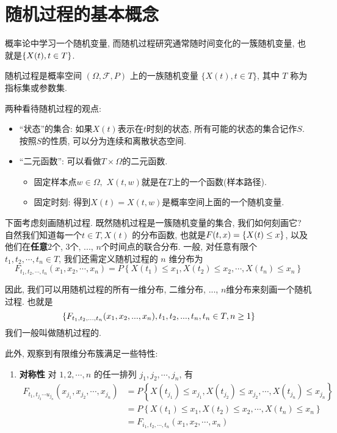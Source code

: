 \documentclass{ctexart}
\begin{document}
\section{随机过程的基本概念}

概率论中学习一个随机变量, 而随机过程研究通常随时间变化的一簇随机变量, 也就是$\{X(t), t\in T\}$. 

\begin{definition}[随机过程]
    随机过程是概率空间 $(\Omega, \mathscr F, P)$ 上的一族随机变量 $\{X(t), t \in T\}$, 其中 $T$ 称为指标集或参数集. 
\end{definition}

两种看待随机过程的观点: 
\begin{itemize}
    \item ``状态''的集合: 如果$X(t)$表示在$t$时刻的状态, 所有可能的状态的集合记作$S$. 按照$S$的性质, 可以分为连续和离散状态空间. 
    \item ``二元函数'': 可以看做$T\times \Omega$的二元函数. 
\begin{itemize}
    \item 固定样本点$w\in \Omega,$ $X(t,w)$就是在$T$上的一个函数(样本路径). 
    \item 固定时刻: 得到$X(t)=X(t,w)$是概率空间上面的一个随机变量. 
\end{itemize}
\end{itemize}

下面考虑刻画随机过程. 既然随机过程是一簇随机变量的集合, 我们如何刻画它? 自然我们知道每一个$t \in T, X(t)$
的分布函数, 也就是$F(t,x)=\{X(t)\leq x\}$, 以及他们在{\bf{任意}}$2$个, 3个, $...$, $n$个时间点的联合分布.  一般, 对任意有限个 $t_1, t_2, \cdots, t_n \in T$, 我们还需定义随机过程的 $n$ 维分布为
\[
    F_{t_1,t_2, \cdots, t_n}\left(x_1, x_2, \cdots, x_n\right)=P\left\{X\left(t_1\right) \leqslant x_1, X\left(t_2\right) \leqslant x_2, \cdots, X\left(t_n\right) \leqslant x_n\right\}
\]

因此, 我们可以用随机过程的所有一维分布, 二维分布, ..., $n$维分布来刻画一个随机过程. 也就是
\[
    \{F_{t_1,t_2, ... , t_n}(x_1,x_2, ..., x_n), t_1, t_2, ..., t_n,t_n \in T, n\geq 1\}
\]
我们一般叫做随机过程的. 

此外, 观察到有限维分布簇满足一些特性: 
\begin{enumerate}
    \item {\bf{对称性}} 对 $1,2, \cdots, n$ 的任一排列 $j_1, j_2, \cdots, j_n$, 有
        \[
            \begin{aligned}
F_{t_1, t_{j_2} \cdots u_{j_n}}\left(x_{j_1}, x_{j_2}, \cdots, x_{j_n}\right) & =P\left\{X\left(t_{j_1}\right) \leqslant x_{j_1}, X\left(t_{j_2}\right) \leqslant x_{j_2}, \cdots, X\left(t_{j_n}\right) \leqslant x_{j_n}\right\} \\
& =P\left\{X\left(t_1\right) \leqslant x_1, X\left(t_2\right) \leqslant x_2, \cdots, X\left(t_n\right) \leqslant x_n\right\} \\
& =F_{i_1, t_2, \cdots, t_n}\left(x_1, x_2, \cdots, x_n\right)
\end{aligned}
        \]


\end{enumerate}
\end{document}
